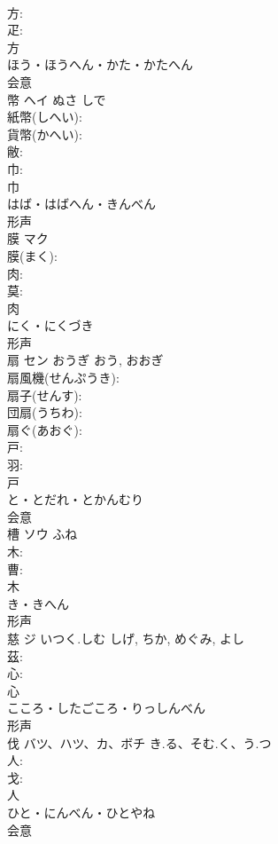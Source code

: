 \documentclass[8pt]{extreport}
\begin{document}
\begin{CJK}{UTF8}{min}
\\	方: 
\\	疋: 
\\	方	
\\	ほう・ほうへん・かた・かたへん	
\\	会意 
\\	幣	ヘイ	ぬさ	しで	
\\	紙幣(しへい): 
\\	貨幣(かへい): 
\\	敝: 
\\	巾: 
\\	巾	
\\	はば・はばへん・きんべん	
\\	形声 
\\	膜	マク			
\\	膜(まく): 
\\	肉: 
\\	莫: 
\\	肉	
\\	にく・にくづき	
\\	形声 
\\	扇	セン	おうぎ	おう, おおぎ	
\\	扇風機(せんぷうき): 
\\	扇子(せんす): 
\\	団扇(うちわ): 
\\	扇ぐ(あおぐ): 
\\	戸: 
\\	羽: 
\\	戸	
\\	と・とだれ・とかんむり	
\\	会意 
\\	槽	ソウ	ふね		
\\	木: 
\\	曹: 
\\	木	
\\	き・きへん	
\\	形声 
\\	慈	ジ	いつく.しむ	しげ, ちか, めぐみ, よし	
\\	茲: 
\\	心: 
\\	心	
\\	こころ・したごころ・りっしんべん	
\\	形声 
\\	伐	バツ、ハツ、カ、ボチ	き.る、そむ.く、う.つ		
\\	人: 
\\	戈: 
\\	人	
\\	ひと・にんべん・ひとやね	
\\	会意 

\end{CJK}
\end{document}
